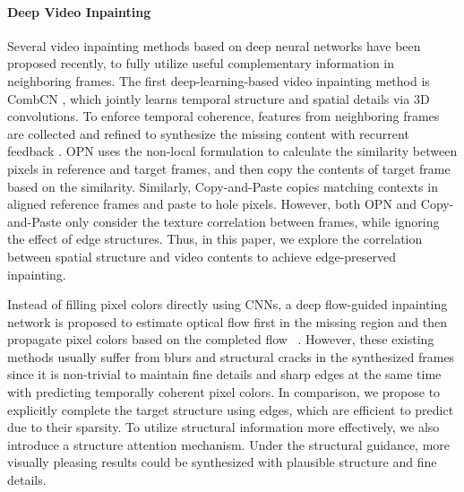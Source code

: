 \paragraph{Deep Video Inpainting}
Several video inpainting methods based on deep neural networks have been proposed recently, to fully utilize useful complementary information in neighboring frames.
%
The first deep-learning-based video inpainting method is CombCN \cite{wang2019video}, which jointly learns temporal structure and spatial details via 3D convolutions.
%
To enforce temporal coherence, features from neighboring frames are collected and refined to synthesize the missing content with recurrent feedback \cite{Kim_2019_CVPR1,Kim_2019_CVPR}. 
{\color{blue}OPN \cite{oh2019onion} uses the non-local formulation to calculate the similarity between pixels in reference and target frames, and then copy the contents of target frame based on the similarity.
Similarly, Copy-and-Paste \cite{lee2019copy} copies matching contexts in aligned reference frames and paste to hole pixels.
However, both OPN and Copy-and-Paste only consider the texture correlation between frames, while ignoring the effect of edge structures.
Thus, in this paper, we explore the correlation between spatial structure and video contents to achieve edge-preserved inpainting.}  

Instead of filling pixel colors directly using CNNs, a deep flow-guided inpainting network is proposed to estimate optical flow first in the missing region and then propagate pixel colors based on the completed flow ~\cite{Xu_2019_CVPR}.
However, these existing methods usually suffer from blurs and structural cracks in the synthesized frames since it is non-trivial to maintain fine details and sharp edges at the same time with predicting temporally coherent pixel colors. 
In comparison, we propose to explicitly complete the target structure using edges, which are efficient to predict due to their sparsity. To utilize structural information more effectively, we also introduce a structure attention mechanism. 
Under the structural guidance, more visually pleasing results could be synthesized with plausible structure and fine details. 

